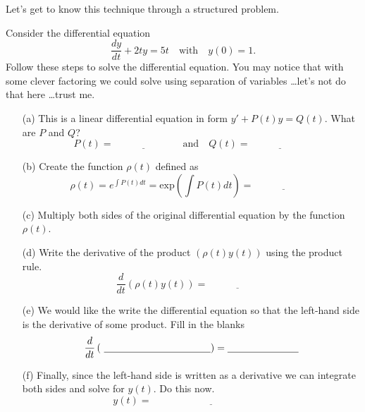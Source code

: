 Let's get to know this technique through a structured problem.
\begin{problem}
    Consider the differential equation 
    \[ \frac{dy}{dt} + 2ty = 5t \quad \text{with} \quad y(0) = 1. \]
    Follow these steps to solve the differential equation.  You may notice that with some
    clever factoring we could solve using separation of variables \ldots let's not do that
    here \ldots trust me.
    \begin{enumerate}
        \item[(a)] This is a linear differential equation in form $y' + P(t) y = Q(t)$.
            What are $P$ and $Q$?
            \[ P(t) = \underline{\hspace{1in}} \quad \text{and} \quad Q(t) =
            \underline{\hspace{1in}} \]
        \item[(b)] Create the function $\rho(t)$ defined as
            \[ \rho(t) = e^{\int P(t) dt} = \text{exp}\left( \int P(t) dt \right) =
            \underline{\hspace{1in}} \]
        \item[(c)] Multiply both sides of the original differential equation by the
            function $\rho(t)$.
            \solution{
                \[ e^{t^2} y' + 2t e^{t^2} y = 5t e^{t^2} \]
            }
        \item[(d)] Write the derivative of the product $\left( \rho(t) y(t) \right)$ using the product
            rule.
            \[ \frac{d}{dt} \left( \rho(t) y(t) \right) = \underline{\hspace{1in}} \]
        \item[(e)] We would like the write the differential equation so that the left-hand
            side is the derivative of some product.  Fill in the blanks
            \[ \frac{d}{dt}\left( \,\,\underline{\hspace{1.5in}}\right) =
        \underline{\hspace{1in}} \]
        \solution{
            \[ \frac{d}{dt}\left[ e^{t^2} y \right] = 5te^{t^2} \]
            }
    \item[(f)] Finally, since the left-hand side is written as a derivative we can
        integrate both sides and solve for $y(t)$.  Do this now.
        \[ y(t) = \underline{\hspace{2in}} \]
        \solution{
            \[ e^{t^2} y = 5\int te^{t^2} dt \implies e^{t^2} y = \frac{5}{2} \int e^u du
            = \frac{5}{2} e^{t^2} + C \]
            \[ \implies y(t) = \frac{5}{2} + Ce^{-t^2} \quad \text{and} \quad y(0) = 1
            \implies y(t) = \frac{5}{2} - \frac{3}{2} e^{-t^2}\]
        }
    \end{enumerate}
\end{problem}



